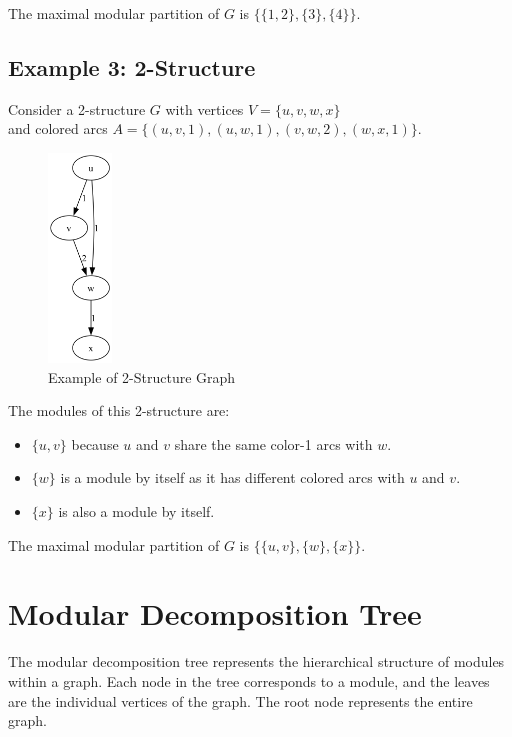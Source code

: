 The maximal modular partition of $G$ is $\{\{1, 2\}, \{3\}, \{4\}\}$.

\subsection*{Example 3: 2-Structure}\label{subsec:example-3:-2-structure}

Consider a 2-structure $G$ with vertices $V = \{u, v, w, x\}$ \\ and colored arcs $A = \{(u, v, 1), (u, w, 1), (v, w, 2), (w, x, 1)\}$.

\begin{figure}[!h]
    \centering
    \includegraphics[width=0.15\textwidth]{images/graphs/2_structure_graph}
    \caption{Example of 2-Structure Graph}
    \label{fig:example-3}
\end{figure}

The modules of this 2-structure are:

\begin{itemize}
    \item $\{u, v\}$ because $u$ and $v$ share the same color-1 arcs with $w$.
    \item $\{w\}$ is a module by itself as it has different colored arcs with $u$ and $v$.
    \item $\{x\}$ is also a module by itself.
\end{itemize}

The maximal modular partition of $G$ is $\{\{u, v\}, \{w\}, \{x\}\}$.


\section{Modular Decomposition Tree}\label{sec:modular-decomposition-tree}

The modular decomposition tree represents the hierarchical structure of modules within a graph.
Each node in the tree corresponds to a module, and the leaves are the individual vertices of the graph.
The root node represents the entire graph.

